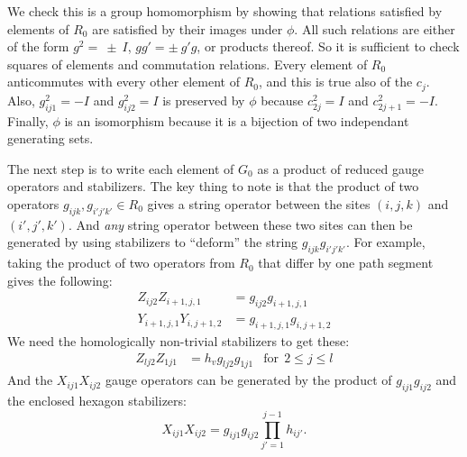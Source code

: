 \documentclass[12pt,notitlepage,longbibliography,nofootinbib,tightenlines]{revtex4}
\begin{document}

We check this is a group homomorphism by showing that relations
satisfied by elements of $R_0$ are satisfied by
their images under $\phi.$
All such relations are either of the form
$g^2=~\pm~I$, $gg'=\pm~g'g$, or
products thereof.
So it is sufficient to check squares of
elements and commutation relations.
Every element of $R_0$ anticommutes with
every other element of $R_0$, and this is true also
of the $c_j.$
Also, $g_{ij1}^2=-I$ and $g_{ij2}^2=I$ 
is preserved by $\phi$ because $c_{2j}^2=I$ and $c_{2j+1}^2=-I$.
Finally, $\phi$ is an isomorphism
because it is a bijection of two independant
generating sets.

The next step is to write each element of $G_0$
as a product of reduced gauge operators and stabilizers.
The key thing to note is that the product of two
operators $g_{ijk}, g_{i'j'k'}\in R_0$ gives a string
operator between the sites $(i,j,k)$ and $(i',j',k')$.
And {\it any} string operator between these
two sites can then be generated by using stabilizers to
``deform'' the string $g_{ijk}g_{i'j'k'}.$
For example, taking the product
of two operators from $R_0$ that differ
by one path segment gives the following:
\begin{align*}
Z_{ij2}Z_{i+1,j,1} &= g_{ij2} g_{i+1,j,1} \\
Y_{i+1,j,1}Y_{i,j+1,2} &= g_{i+1,j,1}g_{i,j+1,2}
\end{align*}
We need the homologically non-trivial stabilizers to get these:
\begin{align*}
Z_{lj2}Z_{1j1} &= h_v g_{lj2} g_{1j1} &\mbox{for}\ \  2\le j\le l
\end{align*}
And the $X_{ij1}X_{ij2}$
gauge operators can be generated
by the product of 
$g_{ij1}g_{ij2}$ and the enclosed hexagon stabilizers:
$$X_{ij1}X_{ij2}=g_{ij1}g_{ij2}\prod_{j'=1}^{j-1} h_{ij'}.$$
\end{document}
